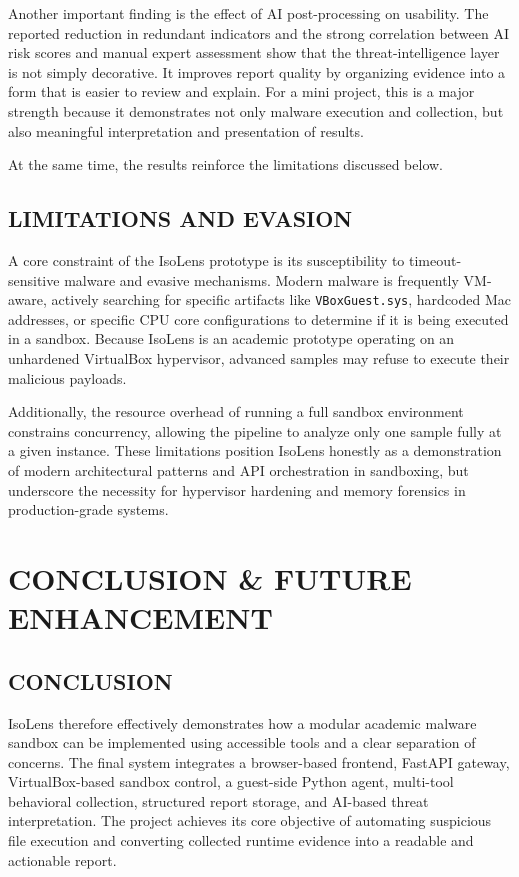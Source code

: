 \documentclass[a4paper,12pt,oneside]{report}
\begin{document}
\par

\par

Another important finding is the effect of AI post-processing on usability. The reported reduction in redundant indicators and the strong correlation between AI risk scores and manual expert assessment show that the threat-intelligence layer is not simply decorative. It improves report quality by organizing evidence into a form that is easier to review and explain. For a mini project, this is a major strength because it demonstrates not only malware execution and collection, but also meaningful interpretation and presentation of results.

At the same time, the results reinforce the limitations discussed below.

\section{LIMITATIONS AND EVASION}
A core constraint of the IsoLens prototype is its susceptibility to timeout-sensitive malware and evasive mechanisms. Modern malware is frequently VM-aware, actively searching for specific artifacts like \texttt{VBoxGuest.sys}, hardcoded Mac addresses, or specific CPU core configurations to determine if it is being executed in a sandbox. Because IsoLens is an academic prototype operating on an unhardened VirtualBox hypervisor, advanced samples may refuse to execute their malicious payloads. 

\par

\par

Additionally, the resource overhead of running a full sandbox environment constrains concurrency, allowing the pipeline to analyze only one sample fully at a given instance. These limitations position IsoLens honestly as a demonstration of modern architectural patterns and API orchestration in sandboxing, but underscore the necessity for hypervisor hardening and memory forensics in production-grade systems.

\chapter{CONCLUSION \& FUTURE ENHANCEMENT}
\section{CONCLUSION}
IsoLens therefore effectively demonstrates how a modular academic malware sandbox can be implemented using accessible tools and a clear separation of concerns. The final system integrates a browser-based frontend, FastAPI gateway, VirtualBox-based sandbox control, a guest-side Python agent, multi-tool behavioral collection, structured report storage, and AI-based threat interpretation. The project achieves its core objective of automating suspicious file execution and converting collected runtime evidence into a readable and actionable report.
\end{document}
